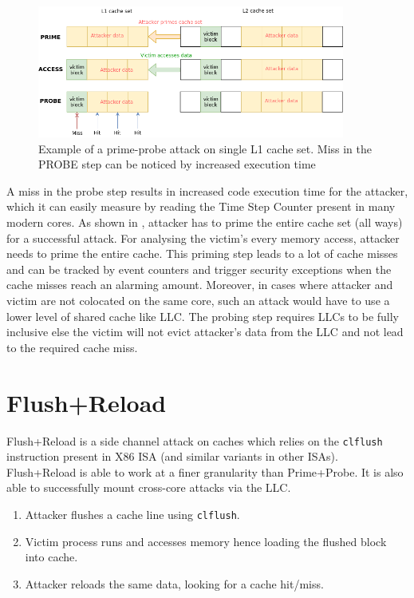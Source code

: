 \begin{figure}[h]
\includegraphics[width=0.9\textwidth]{figures/prime_probe}
\caption[Prime Probe attack]{Example of a prime-probe attack on single L1 cache set.
    Miss in the PROBE step can be noticed by increased execution time}
\label{fig:pp}
\end{figure}

A miss in the probe step results in increased code execution time for the attacker,
which it can easily measure by reading the Time Step Counter present in many
modern cores. As shown in , attacker has to prime the entire
cache set (all ways) for a successful attack. For analysing the victim's every
memory access, attacker needs to prime the entire cache. This priming step
leads to a lot of cache misses and can be tracked by event counters and
trigger security exceptions when the cache misses reach an alarming amount.
Moreover, in cases where attacker and victim are not colocated on the same
core, such an attack would have to use a lower level of shared cache like LLC.
The probing step requires LLCs to be fully inclusive else the victim will not
evict attacker's data from the LLC and not lead to the required cache miss.

\section{Flush+Reload}

Flush+Reload is a side channel attack on caches which relies on the
\texttt{clflush} instruction present in X86 ISA (and similar variants in other
ISAs). Flush+Reload is able to work at a finer granularity than Prime+Probe.
It is also able to successfully mount cross-core attacks via the LLC.

\begin{enumerate}
\item Attacker flushes a cache line using \texttt{clflush}.
\item Victim process runs and accesses memory hence loading the flushed block
    into cache.
\item Attacker reloads the same data, looking for a cache hit/miss.
\end{enumerate}

